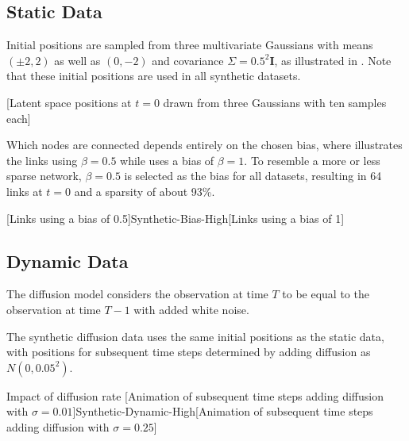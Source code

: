     \subsection{Static Data}
    
        Initial positions are sampled from three multivariate Gaussians with means $(\pm2,2)$ as well as $(0,-2)$ and covariance $\Sigma=0.5^2\bm{I}$, as illustrated in . Note that these initial positions are used in all synthetic datasets.

        [Latent space positions at $t=0$ drawn from three Gaussians with ten samples each]
    
        Which nodes are connected depends entirely on the chosen bias, where  illustrates the links using $\beta=0.5$ while  uses a bias of $\beta=1$. To resemble a more or less sparse network, $\beta=0.5$ is selected as the bias for all datasets, resulting in 64 links at $t=0$ and a sparsity of about 93\%.
        
        [Links using a bias of 0.5]{Synthetic-Bias-High}[Links using a bias of 1]
    
        
    
    \subsection{Dynamic Data}
    
        The diffusion model considers the observation at time $T$ to be equal to the observation at time $T-1$ with added white noise.
    
        The synthetic diffusion data uses the same initial positions as the static data, with positions for subsequent time steps determined by adding diffusion as $N(0,0.05^2)$. 
        
        
        
        Impact of diffusion rate
        [Animation of subsequent time steps adding diffusion with $\sigma=0.01$]{Synthetic-Dynamic-High}[Animation of subsequent time steps adding diffusion with $\sigma=0.25$]
    

